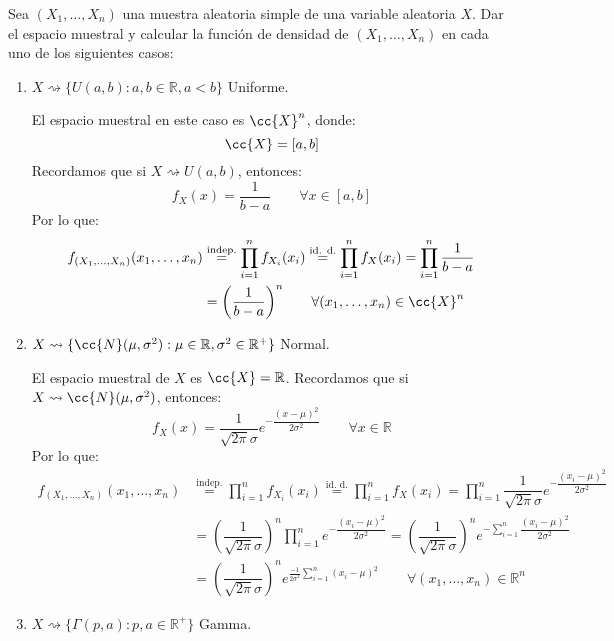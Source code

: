 \begin{ejercicio}
    Sea $(X_1, \ldots, X_n)$ una muestra aleatoria simple de una variable aleatoria $X$. Dar el espacio muestral y calcular la función de densidad de $(X_1, \ldots, X_n)$ en cada uno de los siguientes casos:
    \begin{enumerate}[label=\alph*)]
        \item $X\rightsquigarrow\{U(a,b) : a,b\in \mathbb{R}, a<b\}$ Uniforme.

            El espacio muestral en este caso es $\cc{X}^n$, donde:
            \begin{equation*}
                \cc{X} = [a,b]
            \end{equation*}
            Recordamos que si $X\rightsquigarrow U(a,b)$, entonces:
            \begin{equation*}
                f_X(x) = \dfrac{1}{b-a} \qquad \forall x\in [a,b]
            \end{equation*}
            Por lo que:
            \begin{align*}
                f_{(X_1, \ldots, X_n)}(x_1, \ldots, x_n) &\stackrel{\text{indep.}}{=} \prod_{i=1}^{n} f_{X_i}(x_i) \stackrel{\text{id. d.}}{=} \prod_{i=1}^{n} f_X(x_i) = \prod_{i=1}^{n} \dfrac{1}{b-a} \\ &= {\left(\dfrac{1}{b-a}\right)}^{n} \qquad \forall (x_1, \ldots, x_n) \in \cc{X}^n
            \end{align*}

        \item $X\rightsquigarrow\{\cc{N}(\mu, \sigma^2) : \mu \in \mathbb{R}, \sigma^2 \in \mathbb{R}^+\}$ Normal.

            El espacio muestral de $X$ es $\cc{X} = \mathbb{R}$. Recordamos que si $X\rightsquigarrow \cc{N}(\mu, \sigma^2)$, entonces:
            \begin{equation*}
                f_X(x) = \dfrac{1}{\sqrt{2\pi} \sigma} e^{-\dfrac{{(x-\mu)}^{2}}{2\sigma^2}} \qquad \forall x\in \mathbb{R}
            \end{equation*}
            Por lo que:
            \begin{align*}
                f_{(X_1, \ldots, X_n)}(x_1, \ldots, x_n) &\stackrel{\text{indep.}}{=} \prod_{i=1}^{n} f_{X_i}(x_i) \stackrel{\text{id. d.}}{=} \prod_{i=1}^{n} f_X(x_i) 
                = \prod_{i=1}^{n} \dfrac{1}{\sqrt{2\pi} \sigma} e^{-\dfrac{{(x_i-\mu)}^{2}}{2\sigma^2}}  \\
                &= {\left(\dfrac{1}{\sqrt{2\pi}\sigma}\right)}^{n} \prod_{i=1}^{n} e^{-\dfrac{{(x_i-\mu)}^{2}}{2\sigma^2}}  = {\left(\dfrac{1}{\sqrt{2\pi}\sigma}\right)}^{n} e^{-\sum\limits_{i=1}^n\dfrac{{(x_i-\mu)}^{2}}{2\sigma^2}}   \\
                &= {\left(\dfrac{1}{\sqrt{2\pi}\sigma}\right)}^{n} e^{\frac{-1}{2\sigma^2}\sum\limits_{i=1}^n {(x_i-\mu)}^{2}} \qquad \forall (x_1,\ldots,x_n) \in \mathbb{R}^n
            \end{align*}
        \item $X\rightsquigarrow\{\Gamma(p,a) : p,a\in \mathbb{R}^+\}$ Gamma.


\end{enumerate}
\end{ejercicio}
